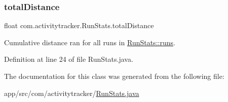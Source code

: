 \subsubsection{\texorpdfstring{totalDistance}{totalDistance}}
{\footnotesize\ttfamily float com.\+activitytracker.\+Run\+Stats.\+total\+Distance\hspace{0.3cm}{\ttfamily [private]}}

Cumulative distance ran for all runs in \mbox{\hyperlink{classcom_1_1activitytracker_1_1_run_stats_a0fd429e9f463ddf4897c507c0e3c0a12}{Run\+Stats\+::runs}}. 

Definition at line 24 of file Run\+Stats.\+java.



The documentation for this class was generated from the following file\+:\begin{DoxyCompactItemize}
\item 
app/src/com/activitytracker/\mbox{\hyperlink{_run_stats_8java}{Run\+Stats.\+java}}\end{DoxyCompactItemize}
